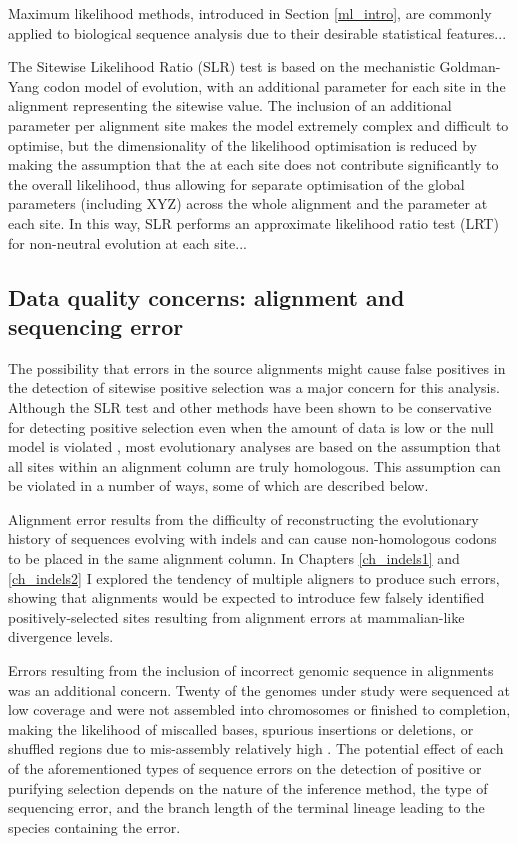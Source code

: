 Maximum likelihood methods, introduced in Section \ref{ml_intro}, are
commonly applied to biological sequence analysis due to their
desirable statistical features... 

The Sitewise Likelihood Ratio (SLR) test is based on the mechanistic
Goldman-Yang codon model of evolution, with an additional parameter
for each site in the alignment representing the sitewise \omg
value. The inclusion of an additional parameter per alignment site
makes the model extremely complex and difficult to optimise, but the
dimensionality of the likelihood optimisation is reduced by making the
assumption that the \omg at each site does not contribute
significantly to the overall likelihood, thus allowing for separate
optimisation of the global parameters (including XYZ) across the whole
alignment and the \omg parameter at each site. In this way, SLR
performs an approximate likelihood ratio test (LRT) for non-neutral
evolution at each site...

\subsection{Data quality concerns: alignment and sequencing error}

The possibility that errors in the source alignments might cause false
positives in the detection of sitewise positive selection was a major
concern for this analysis. Although the SLR test and other \sw \ml
methods have been shown to be conservative for detecting positive
selection even when the amount of data is low or the null model is
violated \citep{Anisimova2002,Anisimova2003,Massingham2005},
most evolutionary analyses are based on the assumption that all sites
within an alignment column are truly homologous. This assumption can
be violated in a number of ways, some of which are described below.

Alignment error results from the difficulty of reconstructing the
evolutionary history of sequences evolving with indels and can cause
non-homologous codons to be placed in the same alignment column. In
Chapters \ref{ch_indels1} and \ref{ch_indels2} I explored the tendency
of multiple aligners to produce such errors, showing that \prankc
alignments would be expected to introduce few falsely identified
positively-selected sites resulting from alignment errors at
mammalian-like divergence levels.

Errors resulting from the inclusion of incorrect genomic sequence in
alignments was an additional concern. Twenty of the genomes under
study were sequenced at low coverage and were not assembled into
chromosomes or finished to completion, making the likelihood of
miscalled bases, spurious insertions or deletions, or shuffled regions
due to mis-assembly relatively high \citep{Green2007}. The potential
effect of each of the aforementioned types of sequence errors on the
detection of positive or purifying selection depends on the nature of
the inference method, the type of sequencing error, and the branch
length of the terminal lineage leading to the species containing the
error.

